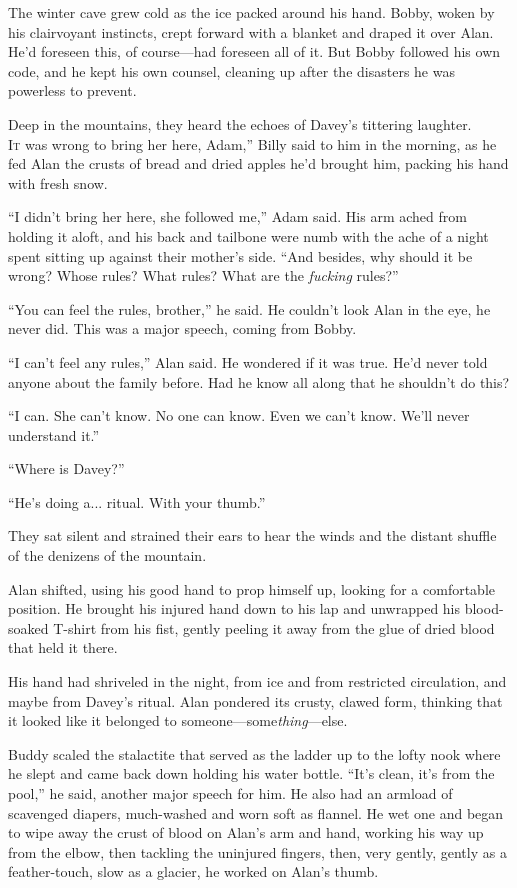\documentclass{article}
\begin{document}
The winter cave grew cold as the ice packed around his hand.  Bobby,
woken by his clairvoyant instincts, crept forward with a blanket and
draped it over Alan.  He'd foreseen this, of course---had foreseen all
of it.  But Bobby followed his own code, and he kept his own counsel,
cleaning up after the disasters he was powerless to prevent.

Deep in the mountains, they heard the echoes of Davey's tittering
laughter.
\\
\lettrine[lines=3, lhang=.5, nindent=0pt, findent=2pt]{I}{t} 
was wrong to bring her here, Adam,'' Billy said to him in the
morning, as he fed Alan the crusts of bread and dried apples he'd
brought him, packing his hand with fresh snow.

``I didn't bring her here, she followed me,'' Adam said.  His arm
ached from holding it aloft, and his back and tailbone were numb with
the ache of a night spent sitting up against their mother's side. 
``And besides, why should it be wrong?  Whose rules?  What rules? 
What are the \textit{fucking} rules?''

``You can feel the rules, brother,'' he said.  He couldn't look Alan
in the eye, he never did.  This was a major speech, coming from Bobby.

``I can't feel any rules,'' Alan said.  He wondered if it was true. 
He'd never told anyone about the family before.  Had he know all along
that he shouldn't do this?

``I can.  She can't know.  No one can know.  Even we can't know. 
We'll never understand it.''

``Where is Davey?''

``He's doing a...  ritual.  With your thumb.''

They sat silent and strained their ears to hear the winds and the
distant shuffle of the denizens of the mountain.

Alan shifted, using his good hand to prop himself up, looking for a
comfortable position.  He brought his injured hand down to his lap and
unwrapped his blood-soaked T-shirt from his fist, gently peeling it
away from the glue of dried blood that held it there.

His hand had shriveled in the night, from ice and from restricted
circulation, and maybe from Davey's ritual.  Alan pondered its crusty,
clawed form, thinking that it looked like it belonged to
someone---some\textit{thing}---else.

Buddy scaled the stalactite that served as the ladder up to the lofty
nook where he slept and came back down holding his water bottle. 
``It's clean, it's from the pool,'' he said, another major speech for
him.  He also had an armload of scavenged diapers, much-washed and
worn soft as flannel.  He wet one and began to wipe away the crust of
blood on Alan's arm and hand, working his way up from the elbow, then
tackling the uninjured fingers, then, very gently, gently as a
feather-touch, slow as a glacier, he worked on Alan's thumb.
\end{document}
